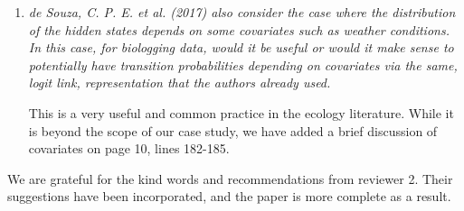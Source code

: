 \documentclass{article}
\begin{document}
\begin{enumerate}
    \item \textit{de Souza, C. P. E. et al. (2017) also consider the case where the distribution of the hidden states depends on some covariates such as weather conditions. In this case, for biologging data, would it be useful or would it make sense to potentially have transition probabilities depending on covariates via the same, logit link, representation that the authors already used.}
    
    This is a very useful and common practice in the ecology literature. While it is beyond the scope of our case study, we have added a brief discussion of covariates on page 10, lines 182-185.
    
\end{enumerate}

We are grateful for the kind words and recommendations from reviewer 2. Their suggestions have been incorporated, and the paper is more complete as a result.
\end{document}
